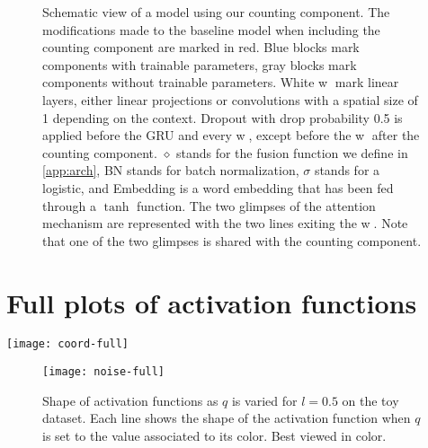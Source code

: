 \documentclass[letterpaper]{article}
\begin{document}
\begin{figure}[htpb!]
    \centering
    \caption{
        Schematic view of a model using our counting component.
        The modifications made to the baseline model when including the counting component are marked in red.
        Blue blocks mark components with trainable parameters, gray blocks mark components without trainable parameters.
        White \textcircled{w} mark linear layers, either linear projections or convolutions with a spatial size of 1 depending on the context.
        Dropout with drop probability 0.5 is applied before the GRU and every \textcircled{w}, except before the \textcircled{w} after the counting component.
        \Large $\diamond$ \normalsize stands for the fusion function we define in \autoref{app:arch}, BN stands for batch normalization, $\sigma$ stands for a logistic, and Embedding is a word embedding that has been fed through a $\tanh$ function.
        The two glimpses of the attention mechanism are represented with the two lines exiting the \textcircled{w}.
        Note that one of the two glimpses is shared with the counting component.
    }
    \label{fig:model}
\end{figure}


\section{Full plots of activation functions}\label{app:rainbows}
\noindent\begin{minipage}{\textwidth}
    \centering
    \texttt{[image: coord-full]}
\end{minipage}

\begin{figure}[htpb!]
    \centering
    \texttt{[image: noise-full]}
    \caption{Shape of activation functions as $q$ is varied for $l=0.5$ on the toy dataset.
    Each line shows the shape of the activation function when $q$ is set to the value associated to its color.
    Best viewed in color.}
\end{figure}
\end{document}
